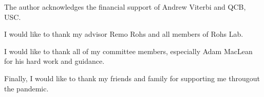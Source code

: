 The author acknowledges the financial support of Andrew Viterbi and QCB, USC.

I would like to thank my advisor Remo Rohs and all members of Rohs Lab.

I would like to thank all of my committee members, especially Adam MacLean for his hard work and guidance. 

Finally, I would like to thank my friends and family for supporting me througout the pandemic.
